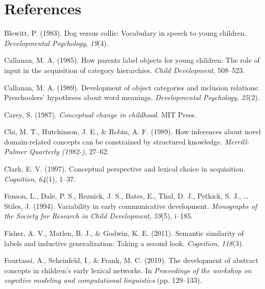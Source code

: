\documentclass[10pt, letterpaper]{article}
\begin{document}
\hypertarget{references}{%
\section{References}\label{references}}

\setlength{\parindent}{-0.1in} 
\setlength{\leftskip}{0.125in}

\noindent

\hypertarget{refs}{}
\leavevmode\hypertarget{ref-blewitt1983}{}%
Blewitt, P. (1983). Dog versus collie: Vocabulary in speech to young
children. \emph{Developmental Psychology}, \emph{19}(4).

\leavevmode\hypertarget{ref-callanan1985}{}%
Callanan, M. A. (1985). How parents label objects for young children:
The role of input in the acquisition of category hierarchies.
\emph{Child Development}, 508--523.

\leavevmode\hypertarget{ref-callanan1989}{}%
Callanan, M. A. (1989). Development of object categories and inclusion
relations: Preschoolers' hypotheses about word meanings.
\emph{Developmental Psychology}, \emph{25}(2).

\leavevmode\hypertarget{ref-carey1987}{}%
Carey, S. (1987). \emph{Conceptual change in childhood}. MIT Press.

\leavevmode\hypertarget{ref-chi1989}{}%
Chi, M. T., Hutchinson, J. E., \& Robin, A. F. (1989). How inferences
about novel domain-related concepts can be constrained by structured
knowledge. \emph{Merrill-Palmer Quarterly (1982-)}, 27--62.

\leavevmode\hypertarget{ref-clark1997}{}%
Clark, E. V. (1997). Conceptual perspective and lexical choice in
acquisition. \emph{Cognition}, \emph{64}(1), 1--37.

\leavevmode\hypertarget{ref-fenson94}{}%
Fenson, L., Dale, P. S., Reznick, J. S., Bates, E., Thal, D. J.,
Pethick, S. J., \ldots{} Stiles, J. (1994). Variability in early
communicative development. \emph{Monographs of the Society for Research
in Child Development}, \emph{59}(5), i--185.

\leavevmode\hypertarget{ref-fisher2011}{}%
Fisher, A. V., Matlen, B. J., \& Godwin, K. E. (2011). Semantic
similarity of labels and inductive generalization: Taking a second look.
\emph{Cognition}, \emph{118}(3).

\leavevmode\hypertarget{ref-fourtassi2019}{}%
Fourtassi, A., Scheinfeld, I., \& Frank, M. C. (2019). The development
of abstract concepts in children's early lexical networks. In
\emph{Proceedings of the workshop on cognitive modeling and
computational linguistics} (pp. 129--133).
\end{document}
